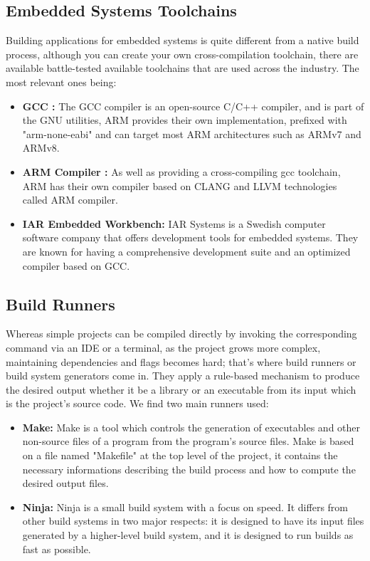 \subsection{Embedded Systems Toolchains}
Building applications for embedded systems is quite different from a native build process, although you can create your own cross-compilation toolchain, there are available battle-tested available toolchains that are used across the industry. The most relevant ones being:
\begin{itemize}
    \item \textbf{GCC :} The GCC compiler is an open-source C/C++ compiler, and is part of the GNU utilities, ARM provides their own implementation, prefixed with "arm-none-eabi" and can target most ARM architectures such as ARMv7 and ARMv8.
    \item \textbf{ARM Compiler :} As well as providing a cross-compiling gcc toolchain, ARM has their own compiler based on CLANG and LLVM technologies called ARM compiler.
    \item \textbf{IAR Embedded Workbench:} IAR Systems is a Swedish computer software company that offers development tools for embedded systems. They are known for having a comprehensive development suite and an optimized compiler based on GCC.
\end{itemize}
\subsection{Build Runners}
Whereas simple projects can be compiled directly by invoking the corresponding command via an IDE or a terminal, as the project grows more complex, maintaining dependencies and flags becomes hard; that's where build runners or build system generators come in. They apply a rule-based mechanism to produce the desired output whether it be a library or an executable from its input which is the project's source code.
We find two main runners used:
\begin{itemize}
    \item \textbf{Make:} Make is a tool which controls the generation of executables and other non-source files of a program from the program's source files. Make is based on a file named "Makefile" at the top level of the project, it contains the necessary informations describing the build process and how to compute the desired output files.
    \item \textbf{Ninja:} Ninja is a small build system with a focus on speed. It differs from other build systems in two major respects: it is designed to have its input files generated by a higher-level build system, and it is designed to run builds as fast as possible.
\end{itemize}
\newpage
